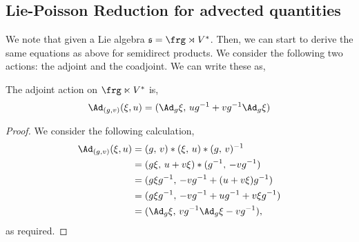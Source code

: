 \subsection{Lie-Poisson Reduction for advected quantities}
We note that given a Lie algebra $\mathfrak{s} = \frg \rtimes V^*$. Then, we can start to derive the same equations as above for semidirect products. We consider the following two actions: the adjoint and the coadjoint. We can write these as,
\begin{nprop}
  The adjoint action on $\frg \ltimes V^*$ is,
  $$ \Ad_{(g,v)}(\xi, u) = (\Ad_g\xi,\,  ug^{-1} + vg^{-1}\Ad_g\xi) $$
\end{nprop}
\begin{proof}
  We consider the following calculation,
  \begin{align*}
    \Ad_{(g,v)}(\xi, u) &= (g,\, v) * (\xi,\, u) * (g,\, v)^{-1} \\
    &= (g\xi,\, u + v\xi) * (g^{-1},\, -vg^{-1}) \\
    &= (g\xi g^{-1},\, -vg^{-1} + (u + v\xi)g^{-1}) \\
    &= (g\xi g^{-1},\, -vg^{-1} + ug^{-1} + v\xi g^{-1}) \\
    &= (\Ad_g \xi,\, vg^{-1}\Ad_g \xi - vg^{-1}),
  \end{align*}
  as required.
\end{proof}

